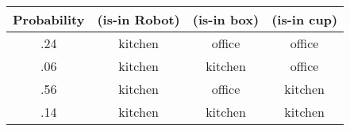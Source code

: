 \small
\begin{tabular}{cccc}
\hline
Probability & (is-in Robot)  & (is-in box)  & (is-in cup) \\
\hline
.24 & kitchen & office & office \\
.06 & kitchen & kitchen & office \\
.56 & kitchen & office & kitchen \\
.14 & kitchen & kitchen & kitchen \\
\hline
\end{tabular}
\normalsize











